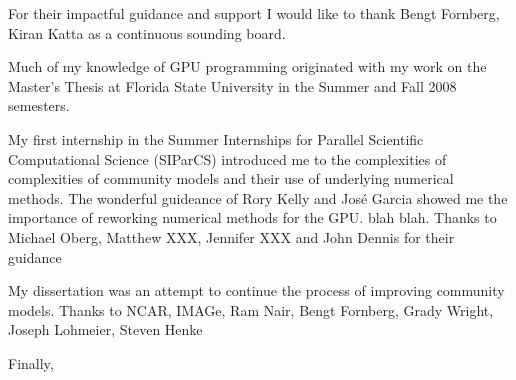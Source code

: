 \begin{acknowledgments}

    For their impactful guidance and support I would like to thank Bengt Fornberg, Kiran Katta as a continuous sounding board. 

    Much of my knowledge of GPU programming originated with my work on the
    Master's Thesis at Florida State University in the Summer and Fall 2008
    semesters.

    My first internship in the Summer Internships for Parallel Scientific
    Computational Science (SIParCS) introduced me to the complexities of
    complexities of community models and their use of underlying numerical
    methods. The wonderful guideance of Rory Kelly and Jos\'{e} Garcia showed
    me the importance of reworking numerical methods for the GPU. blah blah.
    Thanks to Michael Oberg, Matthew XXX, Jennifer XXX and John Dennis for
    their guidance

    My dissertation was an attempt to continue the process of improving
    community models. Thanks to NCAR, IMAGe, Ram Nair, Bengt Fornberg, Grady Wright, Joseph Lohmeier, Steven Henke

    Finally,  
\end{acknowledgments}
